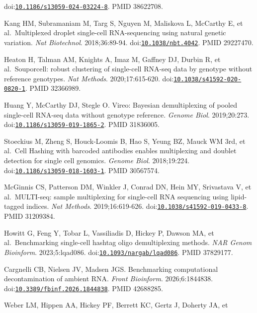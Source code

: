 \documentclass[11pt]{article}
\begin{document}
\begin{enumerate}[label={[\arabic*]},leftmargin=2.6em,labelsep=0.5em,itemsep=1.5pt]
  doi:\href{https://doi.org/10.1186/s13059-024-03224-8}{\nolinkurl{10.1186/s13059-024-03224-8}}.
  PMID 38622708.
\item
  Kang HM, Subramaniam M, Targ S, Nguyen M, Maliskova L, McCarthy E, et
  al.~Multiplexed droplet single-cell RNA-sequencing using natural
  genetic variation. \emph{Nat Biotechnol}. 2018;36:89-94.
  doi:\href{https://doi.org/10.1038/nbt.4042}{\nolinkurl{10.1038/nbt.4042}}. PMID
  29227470.
\item
  Heaton H, Talman AM, Knights A, Imaz M, Gaffney DJ, Durbin R, et
  al.~Souporcell: robust clustering of single-cell RNA-seq data by
  genotype without reference genotypes. \emph{Nat Methods}.
  2020;17:615-620.
  doi:\href{https://doi.org/10.1038/s41592-020-0820-1}{\nolinkurl{10.1038/s41592-020-0820-1}}.
  PMID 32366989.
\item
  Huang Y, McCarthy DJ, Stegle O. Vireo: Bayesian demultiplexing of
  pooled single-cell RNA-seq data without genotype reference.
  \emph{Genome Biol}. 2019;20:273.
  doi:\href{https://doi.org/10.1186/s13059-019-1865-2}{\nolinkurl{10.1186/s13059-019-1865-2}}.
  PMID 31836005.
\item
  Stoeckius M, Zheng S, Houck-Loomis B, Hao S, Yeung BZ, Mauck WM 3rd,
  et al.~Cell Hashing with barcoded antibodies enables multiplexing and
  doublet detection for single cell genomics. \emph{Genome Biol}.
  2018;19:224.
  doi:\href{https://doi.org/10.1186/s13059-018-1603-1}{\nolinkurl{10.1186/s13059-018-1603-1}}.
  PMID 30567574.
\item
  McGinnis CS, Patterson DM, Winkler J, Conrad DN, Hein MY, Srivastava
  V, et al.~MULTI-seq: sample multiplexing for single-cell RNA
  sequencing using lipid-tagged indices. \emph{Nat Methods}.
  2019;16:619-626.
  doi:\href{https://doi.org/10.1038/s41592-019-0433-8}{\nolinkurl{10.1038/s41592-019-0433-8}}.
  PMID 31209384.
\item
  Howitt G, Feng Y, Tobar L, Vassiliadis D, Hickey P, Dawson MA, et
  al.~Benchmarking single-cell hashtag oligo demultiplexing methods.
  \emph{NAR Genom Bioinform}. 2023;5:lqad086.
  doi:\href{https://doi.org/10.1093/nargab/lqad086}{\nolinkurl{10.1093/nargab/lqad086}}.
  PMID 37829177.
\item
  Cargnelli CB, Nielsen JV, Madsen JGS. Benchmarking computational
  decontamination of ambient RNA. \emph{Front Bioinform}.
  2026;6:1844838.
  doi:\href{https://doi.org/10.3389/fbinf.2026.1844838}{\nolinkurl{10.3389/fbinf.2026.1844838}}.
  PMID 42688285.
\item
  Weber LM, Hippen AA, Hickey PF, Berrett KC, Gertz J, Doherty JA, et

\end{enumerate}
\end{document}
